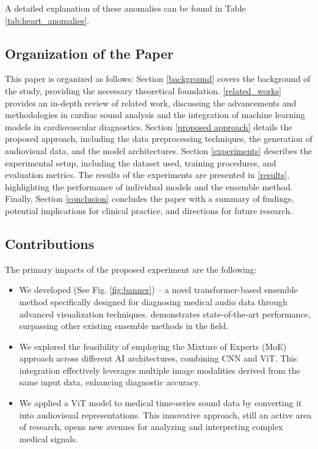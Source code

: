A detailed explanation of these anomalies can be found in Table \ref{tab:heart_anomalies}.

\subsection{Organization of the Paper}
This paper is organized as follows: Section \ref{background} covers the background of the study, providing the necessary theoretical foundation. \ref{related_works} provides an in-depth review of related work, discussing the advancements and methodologies in cardiac sound analysis and the integration of machine learning models in cardiovascular diagnostics. Section \ref{proposed approach} details the proposed approach, including the data preprocessing techniques, the generation of audiovisual data, and the model architectures. Section \ref{experiments} describes the experimental setup, including the dataset used, training procedures, and evaluation metrics. The results of the experiments are presented in \ref{results}, highlighting the performance of individual models and the ensemble method. Finally, Section \ref{conclusion} concludes the paper with a summary of findings, potential implications for clinical practice, and directions for future research.

\subsection{Contributions}
The primary impacts of the proposed experiment are the following:
\begin{itemize}
    \item We developed \ENACT (See Fig. \ref{fig:banner}) -- a novel transformer-based ensemble method specifically designed for diagnosing medical audio data through advanced visualization techniques. \ENACT demonstrates state-of-the-art performance, surpassing other existing ensemble methods in the field.
    \item We explored the feasibility of employing the Mixture of Experts (MoE) approach across different AI architectures, combining CNN and ViT. This integration effectively leverages multiple image modalities derived from the same input data, enhancing diagnostic accuracy.
    \item We applied a ViT model to medical time-series sound data by converting it into audiovisual representations. This innovative approach, still an active area of research, opens new avenues for analyzing and interpreting complex medical signals.

\end{itemize}

